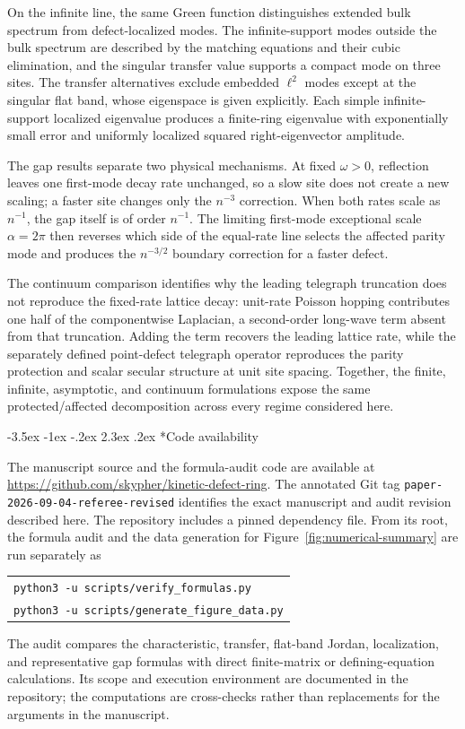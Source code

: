 \documentclass[twoside,10pt]{article}
\makeatletter
\numberwithin{equation}{section}
\theoremstyle{slbody}
\theoremstyle{definition}
\theoremstyle{remark}
\renewcommand{\section}{%
  \@startsection{section}{1}{\z@}%
    {-3.5ex \@plus -1ex \@minus -.2ex}%
    {2.3ex \@plus .2ex}%
    {\normalfont\large\bfseries}}
\makeatother
\begin{document}
On the infinite line, the same Green function distinguishes extended
bulk spectrum from defect-localized modes.  The infinite-support modes outside
the bulk spectrum are described by the matching equations and their cubic
elimination, and
the singular transfer value supports a compact mode on three sites.  The
transfer alternatives exclude embedded $\ell^2$ modes except at the
singular flat band, whose eigenspace is given explicitly.  Each simple
infinite-support localized eigenvalue produces a finite-ring eigenvalue with
exponentially small error and uniformly localized squared right-eigenvector
amplitude.

The gap results separate two physical mechanisms.  At fixed
$\omega>0$, reflection leaves one first-mode decay rate unchanged, so a
slow site does not create a new scaling; a faster site changes only the
$n^{-3}$ correction.  When both rates scale as $n^{-1}$, the gap itself
is of order $n^{-1}$.  The limiting first-mode exceptional scale
$\alpha=2\pi$ then reverses which side of the equal-rate line selects the
affected parity mode and produces the $n^{-3/2}$ boundary correction for
a faster defect.

The continuum comparison identifies why the leading telegraph truncation
does not reproduce the fixed-rate lattice decay: unit-rate Poisson hopping
contributes one half of the componentwise Laplacian, a second-order
long-wave term absent from that truncation.  Adding the term recovers the
leading lattice rate, while the separately defined
point-defect telegraph operator reproduces the parity protection and scalar
secular structure at unit site spacing.  Together, the finite, infinite,
asymptotic, and continuum formulations expose the same protected/affected
decomposition across every regime considered here.

\enlargethispage{3\baselineskip}
{}
\section*{Code availability}

The manuscript source and the formula-audit code are available at
\url{https://github.com/skypher/kinetic-defect-ring}.  The annotated Git tag
\texttt{paper-2026-09-04-referee-\allowbreak revised} identifies the exact manuscript and
audit revision described here.  The
repository includes a pinned dependency file.  From its root, the formula
audit and the data generation for Figure~\ref{fig:numerical-summary} are run
separately as
\begin{center}
\begin{tabular}{l}
\texttt{python3 -u scripts/verify\_formulas.py}\\
\texttt{python3 -u scripts/generate\_figure\_data.py}
\end{tabular}
\end{center}
The audit compares the characteristic, transfer, flat-band Jordan,
localization, and representative gap formulas with direct finite-matrix
or defining-equation calculations.  Its scope and execution environment
are documented in the repository; the computations are cross-checks rather
than replacements for the arguments in the manuscript.
\end{document}

